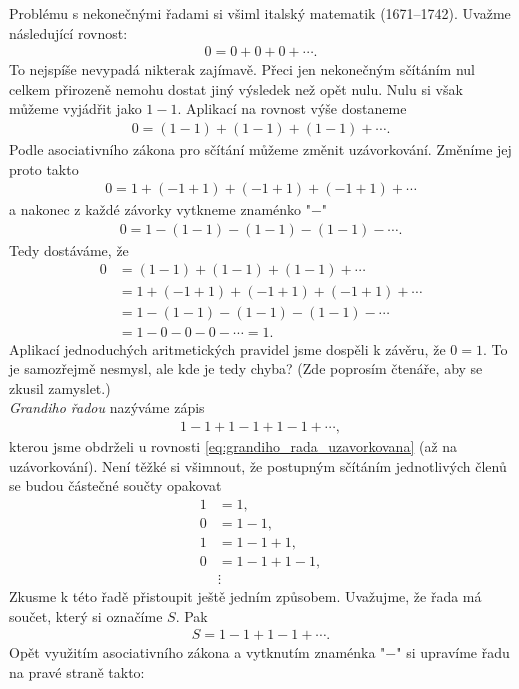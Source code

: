 Problému s nekonečnými řadami si všiml italský matematik  (1671--1742). Uvažme následující rovnost:
\begin{align*}
0=0+0+0+\cdots .
\end{align*}
To nejspíše nevypadá nikterak zajímavě. Přeci jen nekonečným sčítáním nul celkem přirozeně nemohu dostat jiný výsledek než opět nulu. Nulu si však můžeme vyjádřit jako $1-1$. Aplikací na rovnost výše dostaneme
\begin{align}
\label{eq:grandiho_rada_uzavorkovana}
0=(1-1)+(1-1)+(1-1)+\cdots .
\end{align}
Podle asociativního zákona pro sčítání můžeme změnit uzávorkování. Změníme jej proto takto
\begin{align*}
0=1+(-1+1)+(-1+1)+(-1+1)+\cdots
\end{align*}
a nakonec z každé závorky vytkneme znaménko "$-$"
\begin{align*}
0=1-(1-1)-(1-1)-(1-1)-\cdots .
\end{align*}
Tedy dostáváme, že
\begin{align*}
0&=(1-1)+(1-1)+(1-1)+\cdots \\ &= 1+(-1+1)+(-1+1)+(-1+1)+\cdots \\ &= 1-(1-1)-(1-1)-(1-1)-\cdots \\ &= 1-0-0-0-\cdots = 1 .
\end{align*}
Aplikací jednoduchých aritmetických pravidel jsme dospěli k závěru, že $0=1$. To je samozřejmě nesmysl, ale kde je tedy chyba? (Zde poprosím čtenáře, aby se zkusil zamyslet.)\\
\emph{Grandiho řadou} nazýváme zápis
\begin{align*}
1-1+1-1+1-1+\cdots ,
\end{align*}
kterou jsme obdrželi u rovnosti \eqref{eq:grandiho_rada_uzavorkovana} (až na uzávorkování). Není těžké si všimnout, že postupným sčítáním jednotlivých členů se budou částečné součty opakovat
\begin{align*}
1&=1 ,\\
0&=1-1 ,\\
1&=1-1+1 ,\\
0&=1-1+1-1 ,\\
&\vdots
\end{align*}
Zkusme k této řadě přistoupit ještě jedním způsobem. Uvažujme, že řada má součet, který si označíme $S$. Pak
\begin{align*}
S=1-1+1-1+\cdots .
\end{align*}
Opět využitím asociativního zákona a vytknutím znaménka "$-$" si upravíme řadu na pravé straně takto:
